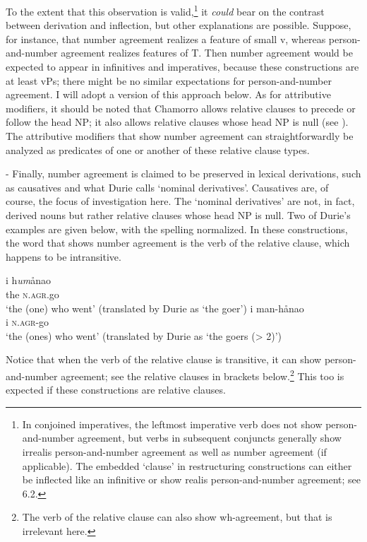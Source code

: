 \documentclass[output=paper,
modfonts
]{LSP/langsci}
\begin{document}
\begin{exe}
\begin{xlist}
To the extent that this observation is valid,\footnote{In conjoined
  imperatives, the leftmost imperative verb does not show
  person-and-number agreement, but verbs in subsequent conjuncts
  generally show irrealis person-and-number agreement as well as number
  agreement (if applicable). The embedded `clause' in restructuring
  constructions can either be inflected like an infinitive or show
  realis person-and-number agreement; see 6.2.} it \emph{could} bear on
the contrast between derivation and inflection, but other explanations
are possible. Suppose, for instance, that number agreement realizes a
feature of small v, whereas person-and-number agreement realizes
features of T. Then number agreement would be expected to appear in
infinitives and imperatives, because these constructions are at least
vPs; there might be no similar expectations for person-and-number
agreement. I will adopt a version of this approach below. As for
attributive modifiers, it should be noted that Chamorro allows relative
clauses to precede or follow the head NP; it also allows relative
clauses whose head NP is null (see \citealt{borja2015}). The
attributive modifiers that show number agreement can straightforwardly
be analyzed as predicates of one or another of these relative clause
types.

- Finally, number agreement is claimed to be preserved in lexical
derivations, such as causatives and what Durie calls `nominal
derivatives'. Causatives are, of course, the focus of investigation
here. The `nominal derivatives' are not, in fact, derived nouns but
rather relative clauses whose head NP is null. Two of Durie's examples
are given below, with the spelling normalized. In these constructions,
the word that shows number agreement is the verb of the relative clause,
which happens to be intransitive.

\ea
	\ea\gll  i h\emph{um}ånao \\
		the \textsc{n.agr.}go\\
		\glt `the (one) who went' (translated by Durie as `the goer')
	\ex\gll i man-hånao\\
		i \textsc{n.agr-}go\\
		\glt `the (ones) who went' (translated by Durie as `the goers (\textgreater{}
		2)')
	\z
\z

Notice that when the verb of the relative clause is transitive, it can show
person-and-number agreement; see the relative clauses in brackets
below.\footnote{The verb of the relative clause can also show
  wh-agreement, but that is irrelevant here.} This too is expected if
these constructions are relative clauses.


\end{xlist}
\end{exe}
\end{document}
